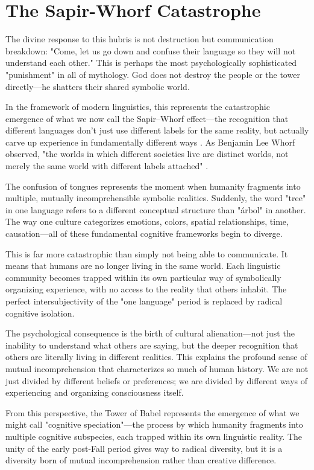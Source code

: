 \section{The Sapir-Whorf Catastrophe}

The divine response to this hubris is not destruction but communication breakdown: "Come, let us go down and confuse their language so they will not understand each other." This is perhaps the most psychologically sophisticated "punishment" in all of mythology. God does not destroy the people or the tower directly—he shatters their shared symbolic world.

In the framework of modern linguistics, this represents the catastrophic emergence of what we now call the Sapir–Whorf effect—the recognition that different languages don't just use different labels for the same reality, but actually carve up experience in fundamentally different ways \parencite{sapir1929status,whorf1956language}. As Benjamin Lee Whorf observed, "the worlds in which different societies live are distinct worlds, not merely the same world with different labels attached" \parencite{whorf1956language}.

The confusion of tongues represents the moment when humanity fragments into multiple, mutually incomprehensible symbolic realities. Suddenly, the word "tree" in one language refers to a different conceptual structure than "árbol" in another. The way one culture categorizes emotions, colors, spatial relationships, time, causation—all of these fundamental cognitive frameworks begin to diverge.

This is far more catastrophic than simply not being able to communicate. It means that humans are no longer living in the same world. Each linguistic community becomes trapped within its own particular way of symbolically organizing experience, with no access to the reality that others inhabit. The perfect intersubjectivity of the "one language" period is replaced by radical cognitive isolation.

The psychological consequence is the birth of cultural alienation—not just the inability to understand what others are saying, but the deeper recognition that others are literally living in different realities. This explains the profound sense of mutual incomprehension that characterizes so much of human history. We are not just divided by different beliefs or preferences; we are divided by different ways of experiencing and organizing consciousness itself.

From this perspective, the Tower of Babel represents the emergence of what we might call "cognitive speciation"—the process by which humanity fragments into multiple cognitive subspecies, each trapped within its own linguistic reality. The unity of the early post-Fall period gives way to radical diversity, but it is a diversity born of mutual incomprehension rather than creative difference.


